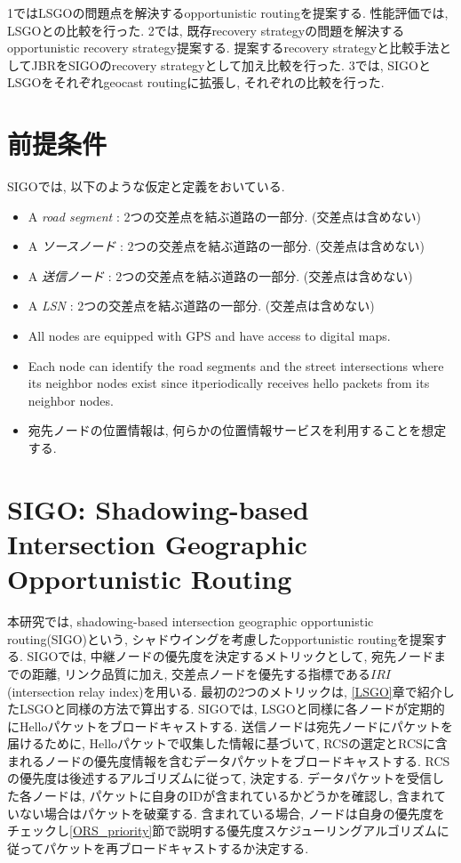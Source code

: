 \documentclass[10pt]{jreport}
\begin{document}
1ではLSGOの問題点を解決するopportunistic routingを提案する. 性能評価では, LSGOとの比較を行った. 2では, 既存recovery strategyの問題を解決するopportunistic recovery strategy提案する. 提案するrecovery strategyと比較手法としてJBRをSIGOのrecovery strategyとして加え比較を行った.
3では, SIGOとLSGOをそれぞれgeocast routingに拡張し, それぞれの比較を行った.

\section{前提条件}
SIGOでは, 以下のような仮定と定義をおいている. 

\begin{itemize}
	\item A \textit{road segment} : 2つの交差点を結ぶ道路の一部分. (交差点は含めない)
	\item A \textit{ソースノード} : 2つの交差点を結ぶ道路の一部分. (交差点は含めない)
	\item A \textit{送信ノード} : 2つの交差点を結ぶ道路の一部分. (交差点は含めない)
	\item A \textit{LSN} : 2つの交差点を結ぶ道路の一部分. (交差点は含めない)
	\item All nodes are equipped with GPS and have access to digital maps.
	\item Each node can identify the road segments and the street intersections where its neighbor nodes exist since itperiodically receives hello packets from its neighbor nodes.
	\item 宛先ノードの位置情報は, 何らかの位置情報サービスを利用することを想定する. 
\end{itemize}




\section{SIGO: Shadowing-based Intersection Geographic Opportunistic Routing}
\label{SIGO}

本研究では, shadowing-based intersection geographic opportunistic routing(SIGO)という, シャドウイングを考慮したopportunistic routingを提案する. SIGOでは, 中継ノードの優先度を決定するメトリックとして, 宛先ノードまでの距離, リンク品質に加え, 交差点ノードを優先する指標である$IRI$(intersection relay index)を用いる. 最初の2つのメトリックは, \ref{LSGO}章で紹介したLSGOと同様の方法で算出する. SIGOでは, LSGOと同様に各ノードが定期的にHelloパケットをブロードキャストする. 送信ノードは宛先ノードにパケットを届けるために, Helloパケットで収集した情報に基づいて, RCSの選定とRCSに含まれるノードの優先度情報を含むデータパケットをブロードキャストする. RCSの優先度は後述するアルゴリズムに従って, 決定する. データパケットを受信した各ノードは, パケットに自身のIDが含まれているかどうかを確認し, 含まれていない場合はパケットを破棄する. 含まれている場合, ノードは自身の優先度をチェックし\ref{ORS_priority}節で説明する優先度スケジューリングアルゴリズムに従ってパケットを再ブロードキャストするか決定する.
\end{document}
